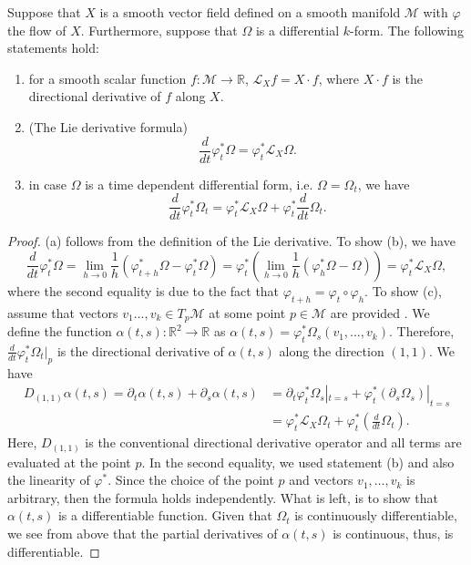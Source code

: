 \begin{theorem} \label{theorem:2.3}
Suppose that $X$ is a smooth vector field defined on a smooth manifold $\mathcal M$ with $\varphi$ the flow of $X$. Furthermore, suppose that $\Omega$ is a differential $k$-form. The following statements hold:
\begin{enumerate} [label=(\alph*)]
\item for a smooth scalar function $f:\mathcal M \to \mathbb R$, $\mathcal L_X f = X\cdot f$, where $X \cdot f$ is the directional derivative of $f$ along $X$.
\item (The Lie derivative formula)
\[
	\frac{d}{dt} \varphi^*_t \Omega = \varphi^*_t \mathcal L_X \Omega.
\]
\item in case $\Omega$ is a time dependent differential form, i.e. $\Omega = \Omega_t$, we have
\[
	\frac{d}{dt} \varphi^*_t \Omega_t = \varphi^*_t \mathcal L_X \Omega + \varphi^*_t \frac{d}{dt} \Omega_t.
\]
\end{enumerate}
\end{theorem}
\begin{proof}
(a) follows from the definition of the Lie derivative. To show (b), we have
\begin{equation} \label{eq:2.11}
	\frac{d}{dt} \varphi^*_t \Omega = \lim_{h\to 0} \frac 1 h( \varphi^*_{t+h} \Omega - \varphi^*_t \Omega ) = \varphi^*_t (\lim_{h\to 0} \frac 1 h (\varphi^*_{h} \Omega - \Omega) ) = \varphi^*_t \mathcal L_X \Omega,
\end{equation}
where the second equality is due to the fact that $\varphi_{t+h} = \varphi_t \circ \varphi_h$. To show (c), assume that vectors $v_1\dots,v_k\in T_{p}\mathcal M$ at some point $p\in \mathcal M$ are provided . We define the function $\alpha(t,s):\mathbb R^2 \to \mathbb R$ as $\alpha(t,s) = \varphi_t^*\Omega_s(v_1,\dots,v_k)$. Therefore, $\frac{d}{dt} \varphi^*_t \Omega_t|_p$ is the directional derivative of $\alpha(t,s)$ along the direction $(1,1)$. We have
\begin{equation} \label{eq:2.12}
\begin{aligned}
	D_{(1,1)} \alpha(t,s) = \partial_t \alpha(t,s) + \partial_s  \alpha(t,s) &= \partial_t \varphi^*_t \Omega_s|_{t=s} + \varphi^*_t (\partial_s \Omega_s)|_{t=s} \\
	&= \varphi^*_t \mathcal L_X \Omega_t + \varphi^*_t (\frac{d}{dt} \Omega_t).
\end{aligned}
\end{equation}
Here, $D_{(1,1)}$ is the conventional directional derivative operator and all terms are evaluated at the point $p$. In the second equality, we used statement (b) and also the linearity of $\varphi^*$. Since the choice of the point $p$ and vectors $v_1,\dots,v_k$ is arbitrary, then the formula holds independently. What is left, is to show that $\alpha(t,s)$ is a differentiable function. Given that $\Omega_t$ is continuously differentiable, we see from above that the partial derivatives of $\alpha(t,s)$ is continuous, thus, is differentiable. 
\end{proof}


